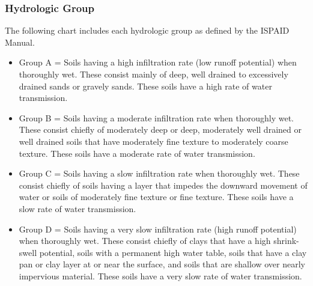\documentclass[11pt]{article}
\begin{document}
\subsubsection{Hydrologic Group}
The following chart includes each hydrologic group as defined by the ISPAID Manual.
\begin{itemize}
\item Group A	=	Soils having a high infiltration rate (low runoff potential) when thoroughly wet.  These consist mainly of deep, well drained to excessively drained sands or gravely sands.  These soils have a high rate of water transmission.
\item Group B	=	Soils having a moderate infiltration rate when thoroughly wet.  These consist chiefly of moderately deep or deep, moderately well drained or well drained soils that have moderately fine texture to moderately coarse texture.  These soils have a moderate rate of water transmission.
\item Group C	=	Soils having a slow infiltration rate when thoroughly wet.  These consist chiefly of soils having a layer that impedes the downward movement of water or soils of moderately fine texture or fine texture.  These soils have a slow rate of water transmission.
\item Group D	=	Soils having a very slow infiltration rate (high runoff potential) when thoroughly wet.  These consist chiefly of clays that have a high shrink-swell potential, soils with a permanent high water table, soils that have a clay pan or clay layer at or near the surface, and soils that are shallow over nearly impervious material.  These soils have a very slow rate of water transmission.
\end{itemize}
\end{document}
